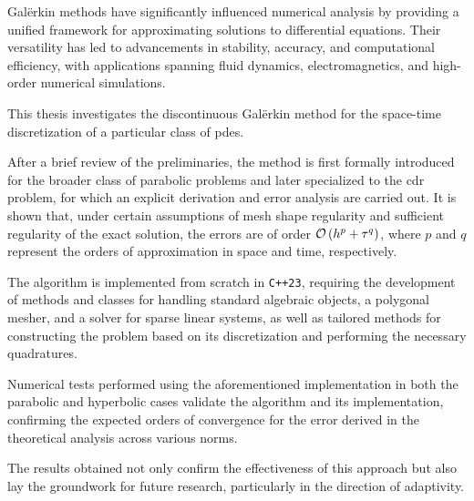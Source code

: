 Galërkin methods have significantly influenced numerical analysis by providing a unified framework for approximating solutions to differential equations. Their versatility has led to advancements in stability, accuracy, and computational efficiency, with applications spanning fluid dynamics, electromagnetics, and high-order numerical simulations.

This thesis investigates the discontinuous Galërkin method for the space-time discretization of a particular class of \acrfull{pdes}.

After a brief review of the preliminaries, the method is first formally introduced for the broader class of parabolic problems and later specialized to the \acrfull{cdr} problem, for which an explicit derivation and error analysis are carried out. It is shown that, under certain assumptions of mesh shape regularity and sufficient regularity of the exact solution, the errors are of order $\mathcal{O} \left( h^p + \tau^q \right)$, where $p$ and $q$ represent the orders of approximation in space and time, respectively.

The algorithm is implemented from scratch in \lstinline{C++23}, requiring the development of methods and classes for handling standard algebraic objects, a polygonal mesher, and a solver for sparse linear systems, as well as tailored methods for constructing the problem based on its discretization and performing the necessary quadratures.

Numerical tests performed using the aforementioned implementation in both the parabolic and hyperbolic cases validate the algorithm and its implementation, confirming the expected orders of convergence for the error derived in the theoretical analysis across various norms.

The results obtained not only confirm the effectiveness of this approach but also lay the groundwork for future research, particularly in the direction of adaptivity.